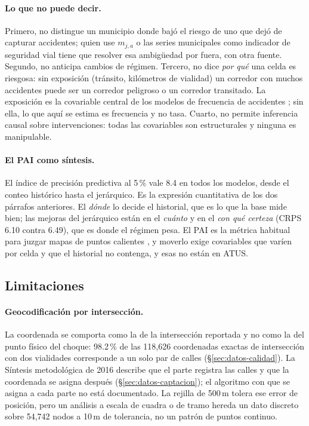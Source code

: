 \paragraph{Lo que no puede decir.} Primero, no distingue un municipio donde
bajó el riesgo de uno que dejó de capturar accidentes; quien use $m_{j,a}$ o
las series municipales como indicador de seguridad vial tiene que resolver esa
ambigüedad por fuera, con otra fuente. Segundo, no anticipa cambios de régimen.
Tercero, no dice \emph{por qué} una celda es riesgosa: sin exposición (tránsito,
kilómetros de vialidad) un corredor con muchos accidentes puede ser un corredor
peligroso o un corredor transitado. La exposición es la
covariable central de los modelos de frecuencia de accidentes
\parencite{lord2010statistical}; sin ella, lo que aquí se estima es frecuencia y no tasa.
Cuarto, no permite inferencia causal sobre intervenciones: todas las
covariables son estructurales y ninguna es manipulable.

\paragraph{El PAI como síntesis.} El índice de precisión predictiva al 5\,\%
vale 8.4 en todos los modelos, desde el conteo histórico hasta el jerárquico.
Es la expresión cuantitativa de los dos párrafos anteriores. El \emph{dónde} lo
decide el historial, que es lo que la base mide bien; las
mejoras del jerárquico están en el \emph{cuánto} y en el \emph{con qué
	certeza} (CRPS 6.10 contra 6.49), que es donde el régimen pesa. El PAI es la
métrica habitual para juzgar mapas de puntos calientes \parencite{chainey2008utility}, y
moverlo exige covariables que varíen por celda y que el historial no contenga, y esas
no están en ATUS.

\subsection{Limitaciones}\label{sec:disc-limitaciones}

\paragraph{Geocodificación por intersección.} La coordenada se comporta como la
de la intersección reportada y no como la del punto físico del choque: 98.2\,\%
de las 118,626 coordenadas exactas de intersección con dos vialidades
corresponde a un solo par de calles (§\ref{sec:datos-calidad}). La Síntesis metodológica de 2016
\parencite{inegi_sintesis2016} describe que el parte registra las calles y que la
coordenada se asigna después (§\ref{sec:datos-captacion}); el algoritmo con que
se asigna a cada parte no está documentado. La rejilla de 500\,m tolera ese
error de posición, pero un análisis a escala de cuadra o de tramo hereda un dato
discreto sobre 54,742 nodos a 10\,m de tolerancia, no un patrón de puntos
continuo.

